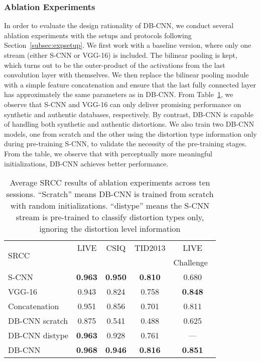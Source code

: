 \documentclass[journal]{IEEEtran}
\begin{document}
\subsubsection{Ablation Experiments}\label{subsubsec:ablation}
In order to evaluate the design rationality of DB-CNN, we conduct several ablation experiments with the setups and protocols following Section~\ref{subsec:expsetup}. We first work with a baseline version, where only one stream (either S-CNN or VGG-16) is included. The bilinear pooling is kept, which turns out to be the outer-product of the activations from the last convolution layer with themselves. We then replace the bilinear pooling module with a simple feature concatenation and ensure that the last fully connected layer has approximately the same parameters as in DB-CNN. From Table~\ref{tab:ablation}, we observe that S-CNN and VGG-16 can only deliver promising performance on synthetic and authentic databases, respectively. By contrast, DB-CNN is capable of handling both synthetic and authentic distortions. We also train two DB-CNN models, one from scratch and the other using the distortion type information only during pre-training S-CNN, to validate the necessity of the pre-training stages. From the table, we observe that
with perceptually more meaningful initializations, DB-CNN achieves better performance.



\begin{table}[t]
  \centering
  \caption{Average SRCC results of ablation experiments across ten sessions. ``Scratch'' means DB-CNN is trained from scratch with random initializations. ``distype'' means the S-CNN stream is pre-trained to classify distortion types only, ignoring the distortion level information}\label{tab:ablation}
  \begin{tabular}{l|cccc}
      \toprule
\multirow{2}{*}{SRCC} & LIVE & CSIQ & TID2013 & LIVE \\
        &\cite{sheikh2006statistical} &~\cite{larson2010most}&\cite{ponomarenko2013color}&Challenge~\cite{ghadiyaram2016massive}\\
     \hline
        S-CNN & \bf{0.963} & {\bf 0.950} & {\bf0.810} & 0.680 \\
        VGG-16 & 0.943 & 0.824 & 0.758 & {\bf0.848} \\
    \hline
     Concatenation &  0.951 & 0.856 & 0.701 & 0.811 \\
     \hline
     DB-CNN scratch &  0.875 & 0.541 & 0.488 & 0.625 \\

     \hline
    DB-CNN distype&  {\bf0.963} & 0.928 & 0.761 & --- \\
     \hline
    DB-CNN& {\bf 0.968} & {\bf0.946} & {\bf 0.816} & {\bf 0.851} \\
     \bottomrule
   \end{tabular}
\end{table}
\end{document}
